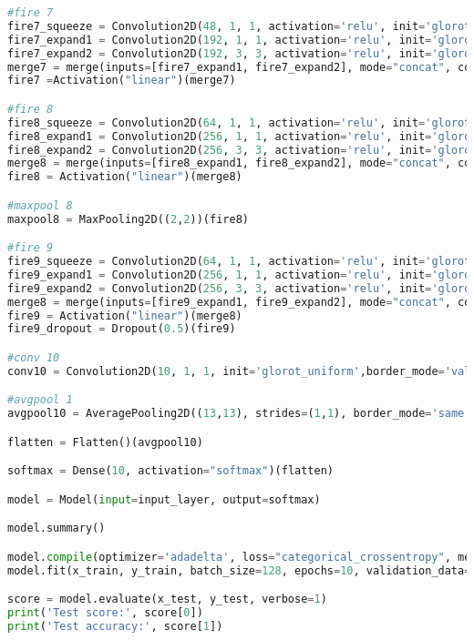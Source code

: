 \begin{lstlisting}[language=Python,label={code:squeezenet},caption={SqueezeNet Code}]
#fire 7
fire7_squeeze = Convolution2D(48, 1, 1, activation='relu', init='glorot_uniform',border_mode='same')(fire6)
fire7_expand1 = Convolution2D(192, 1, 1, activation='relu', init='glorot_uniform',border_mode='same')(fire7_squeeze)
fire7_expand2 = Convolution2D(192, 3, 3, activation='relu', init='glorot_uniform',border_mode='same')(fire7_squeeze)
merge7 = merge(inputs=[fire7_expand1, fire7_expand2], mode="concat", concat_axis=1)
fire7 =Activation("linear")(merge7)

#fire 8
fire8_squeeze = Convolution2D(64, 1, 1, activation='relu', init='glorot_uniform',border_mode='same')(fire7)
fire8_expand1 = Convolution2D(256, 1, 1, activation='relu', init='glorot_uniform',border_mode='same')(fire8_squeeze)
fire8_expand2 = Convolution2D(256, 3, 3, activation='relu', init='glorot_uniform',border_mode='same')(fire8_squeeze)
merge8 = merge(inputs=[fire8_expand1, fire8_expand2], mode="concat", concat_axis=1)
fire8 = Activation("linear")(merge8)

#maxpool 8
maxpool8 = MaxPooling2D((2,2))(fire8)

#fire 9
fire9_squeeze = Convolution2D(64, 1, 1, activation='relu', init='glorot_uniform',border_mode='same')(maxpool8)
fire9_expand1 = Convolution2D(256, 1, 1, activation='relu', init='glorot_uniform',border_mode='same')(fire9_squeeze)
fire9_expand2 = Convolution2D(256, 3, 3, activation='relu', init='glorot_uniform',border_mode='same')(fire9_squeeze)
merge8 = merge(inputs=[fire9_expand1, fire9_expand2], mode="concat", concat_axis=1)
fire9 = Activation("linear")(merge8)
fire9_dropout = Dropout(0.5)(fire9)

#conv 10
conv10 = Convolution2D(10, 1, 1, init='glorot_uniform',border_mode='valid')(fire9_dropout)

#avgpool 1
avgpool10 = AveragePooling2D((13,13), strides=(1,1), border_mode='same')(conv10)

flatten = Flatten()(avgpool10)

softmax = Dense(10, activation="softmax")(flatten)

model = Model(input=input_layer, output=softmax)

model.summary()

model.compile(optimizer='adadelta', loss="categorical_crossentropy", metrics=["accuracy"])
model.fit(x_train, y_train, batch_size=128, epochs=10, validation_data=(x_test, y_test))

score = model.evaluate(x_test, y_test, verbose=1)
print('Test score:', score[0])
print('Test accuracy:', score[1])
\end{lstlisting}

